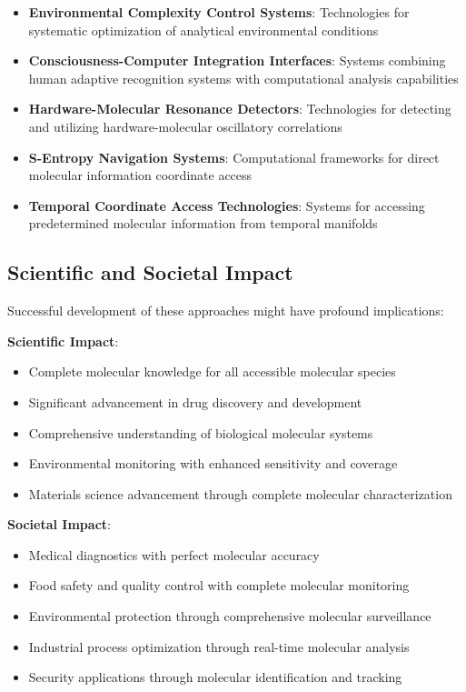 \documentclass[11pt,a4paper]{article}
\theoremstyle{remark}
\begin{document}
\begin{itemize}
\item \textbf{Environmental Complexity Control Systems}: Technologies for systematic optimization of analytical environmental conditions
\item \textbf{Consciousness-Computer Integration Interfaces}: Systems combining human adaptive recognition systems with computational analysis capabilities
\item \textbf{Hardware-Molecular Resonance Detectors}: Technologies for detecting and utilizing hardware-molecular oscillatory correlations
\item \textbf{S-Entropy Navigation Systems}: Computational frameworks for direct molecular information coordinate access
\item \textbf{Temporal Coordinate Access Technologies}: Systems for accessing predetermined molecular information from temporal manifolds
\end{itemize}

\subsection{Scientific and Societal Impact}

Successful development of these approaches might have profound implications:

\textbf{Scientific Impact}:
\begin{itemize}
\item Complete molecular knowledge for all accessible molecular species
\item Significant advancement in drug discovery and development
\item Comprehensive understanding of biological molecular systems
\item Environmental monitoring with enhanced sensitivity and coverage
\item Materials science advancement through complete molecular characterization
\end{itemize}

\textbf{Societal Impact}:
\begin{itemize}
\item Medical diagnostics with perfect molecular accuracy
\item Food safety and quality control with complete molecular monitoring
\item Environmental protection through comprehensive molecular surveillance
\item Industrial process optimization through real-time molecular analysis
\item Security applications through molecular identification and tracking
\end{itemize}
\end{document}
